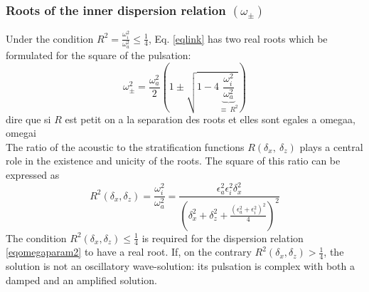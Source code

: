 \documentclass[a4paper,11pt]{article}
\begin{document}
\subsubsection{Roots of the inner dispersion relation $(\omega_\pm)$}
Under the condition $\displaystyle R^2=\frac{\omega_i^2}{\omega_a^2}\le \frac{1}{4}$, Eq. \ref{eqlink} has two real roots which be formulated for the square of the pulsation:
\begin{equation}
	\omega_{\pm}^2
	=\frac{\omega_a^2}{2}
	\left(
	1\pm
	\sqrt{1-4\underbrace{\frac{\omega_i^2}{\omega_a^2}}_{\equiv\ R^2}}
	\right)
\label{solseq}
\end{equation}
{\color{red}dire que si $R$ est petit on a la separation des roots et elles sont egales a omegaa, omegai}\\
The ratio of the acoustic to the stratification functions $R(\delta_x,\ \delta_z)$ plays a central role in the existence and unicity of the roots. The square of this ratio can be expressed as
\begin{equation}
	R^2(\delta_x,\delta_z)=
	\frac{\omega_i^2}{\omega_a^2}=
	\frac{\epsilon_a^2\epsilon_i^2\delta_x^2}
	{\left(\delta_x^2+\delta_z^2
	+\frac{(\epsilon_a^2+\epsilon_i^2)^2}{4}
	\right)^2}
\label{eqratio}
\end{equation}
The condition $\displaystyle R^2(\delta_x,\delta_z)\le \frac{1}{4}$ is required for the dispersion relation \ref{eqomegaparam2} to have a real root. If, on the contrary $\displaystyle R^2(\delta_x,\delta_z) >\frac{1}{4}$, the solution is not an oscillatory wave-solution: its pulsation is complex with both a damped and an amplified solution.
\end{document}
